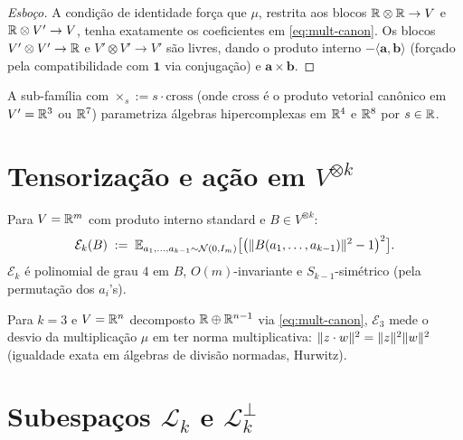 \documentclass[tensorial.tex]{subfiles}
\providecommand{\sL}{\mathcal{L}}
\providecommand{\sLp}{\mathcal{L}^\perp}
\begin{document}
\begin{proof}[Esboço]
A condição de identidade força que $\mu$, restrita aos blocos
$\mathbb{R} \otimes \mathbb{R} \to V$ e $\mathbb{R} \otimes V' \to V$, tenha exatamente os
coeficientes em \eqref{eq:mult-canon}. Os blocos $V' \otimes V' \to \mathbb{R}$ e
$V' \otimes V' \to V'$ são livres, dando o produto interno
$-\langle \boldsymbol{a}, \boldsymbol{b}\rangle$ (forçado pela compatibilidade
com $\mathbf{1}$ via conjugação) e $\boldsymbol{a} \times \boldsymbol{b}$.
\end{proof}

\begin{definicao}[Família $\mu_s$]
A sub-família com $\times_s := s \cdot \mathrm{cross}$ (onde $\mathrm{cross}$
é o produto vetorial canônico em $V' = \mathbb{R}^3$ ou $\mathbb{R}^7$) parametriza
álgebras hipercomplexas em $\mathbb{R}^4$ e $\mathbb{R}^8$ por $s \in \mathbb{R}$.
\end{definicao}

\section{Tensorização e ação em $V^{\otimes k}$}\label{sec:tensorizacao}

\begin{definicao}
Para $V = \mathbb{R}^m$ com produto interno standard e $B \in V^{\otimes k}$:
\begin{equation}\label{eq:E-k-tensor}
  \mathcal{E}_k(B) \;:=\; \mathbb{E}_{a_1, \ldots, a_{k-1} \sim \mathcal{N}(0, I_m)}\bigl[\bigl(\| B(a_1, \ldots, a_{k-1}) \|^2 - 1\bigr)^2\bigr].
\end{equation}
$\mathcal{E}_k$ é polinomial de grau $4$ em $B$, $O(m)$-invariante e
$S_{k-1}$-simétrico (pela permutação dos $a_i$'s).
\end{definicao}

\begin{observacao}
Para $k = 3$ e $V = \mathbb{R}^n$ decomposto $\mathbb{R} \oplus \mathbb{R}^{n-1}$ via
\eqref{eq:mult-canon}, $\mathcal{E}_3$ mede o desvio da multiplicação
$\mu$ em ter norma multiplicativa: $\| z \cdot w \|^2 = \| z \|^2 \| w \|^2$
(igualdade exata em álgebras de divisão normadas, Hurwitz).
\end{observacao}

\section{Subespaços $\sL_k$ e $\sLp_k$}\label{sec:L-perp}
\end{document}
